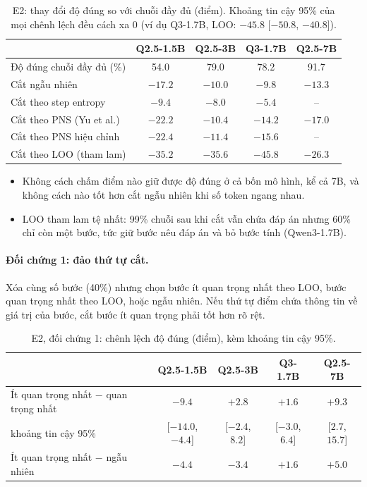 \documentclass[11pt]{article}
\begin{document}
\begin{table}[h]
\centering\small
\caption{E2: thay đổi độ đúng so với chuỗi đầy đủ (điểm). Khoảng tin cậy 95\% của mọi chênh lệch đều cách
xa 0 (ví dụ Q3-1.7B, LOO: $-45.8$ [$-50.8$, $-40.8$]).}
\begin{tabular}{lcccc}
\toprule
 & Q2.5-1.5B & Q2.5-3B & Q3-1.7B & Q2.5-7B \\
\midrule
Độ đúng chuỗi đầy đủ (\%) & 54.0 & 79.0 & 78.2 & 91.7 \\
Cắt ngẫu nhiên & $-17.2$ & $-10.0$ & $-9.8$ & $-13.3$ \\
Cắt theo step entropy & $-9.4$ & $-8.0$ & $-5.4$ & -- \\
Cắt theo PNS (Yu et al.) & $-22.2$ & $-10.4$ & $-14.2$ & $-17.0$ \\
Cắt theo PNS hiệu chỉnh & $-22.4$ & $-11.4$ & $-15.6$ & -- \\
Cắt theo LOO (tham lam) & $-35.2$ & $-35.6$ & $-45.8$ & $-26.3$ \\
\bottomrule
\end{tabular}
\end{table}

\begin{cachdoc}
\begin{itemize}[leftmargin=*,itemsep=1pt]
\item Không cách chấm điểm nào giữ được độ đúng ở cả bốn mô hình, kể cả 7B, và không cách nào tốt hơn cắt
  ngẫu nhiên khi số token ngang nhau.
\item LOO tham lam tệ nhất: 99\% chuỗi sau khi cắt vẫn chứa đáp án nhưng 60\% chỉ còn một bước, tức giữ
  bước nêu đáp án và bỏ bước tính (Qwen3-1.7B).
\end{itemize}
\end{cachdoc}

\paragraph{Đối chứng 1: đảo thứ tự cắt.} Xóa cùng số bước (40\%) nhưng chọn bước ít quan trọng nhất theo
LOO, bước quan trọng nhất theo LOO, hoặc ngẫu nhiên. Nếu thứ tự điểm chứa thông tin về giá trị của bước,
cắt bước ít quan trọng phải tốt hơn rõ rệt.

\begin{table}[h]
\centering\small
\caption{E2, đối chứng 1: chênh lệch độ đúng (điểm), kèm khoảng tin cậy 95\%.}
\begin{tabular}{lcccc}
\toprule
 & Q2.5-1.5B & Q2.5-3B & Q3-1.7B & Q2.5-7B \\
\midrule
Ít quan trọng nhất $-$ quan trọng nhất & $-9.4$ & $+2.8$ & $+1.6$ & $+9.3$ \\
\quad khoảng tin cậy 95\% & [$-14.0$, $-4.4$] & [$-2.4$, $8.2$] & [$-3.0$, $6.4$] & [$2.7$, $15.7$] \\
Ít quan trọng nhất $-$ ngẫu nhiên & $-4.4$ & $-3.4$ & $+1.6$ & $+5.0$ \\
\bottomrule
\end{tabular}
\end{table}
\end{document}
